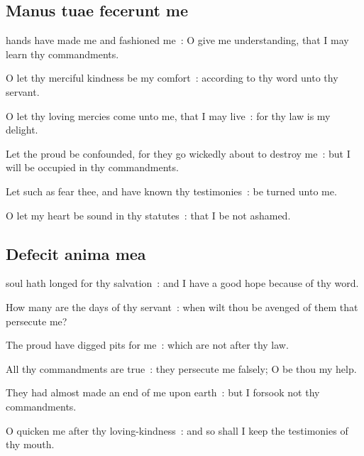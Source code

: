 \subsection{Manus tuae fecerunt me}
 hands have made me and fashioned me~: O give me understanding, that I may learn thy commandments.\par
{}
O let thy merciful kindness be my comfort~: according to thy word unto thy servant.\par
{}O let thy loving mercies come unto me, that I may live~: for thy law is my delight.\par
{}Let the proud be confounded, for they go wickedly about to destroy me~: but I will be occupied in thy commandments.\par
{}Let such as fear thee, and have known thy testimonies~: be turned unto me.\par
{}O let my heart be sound in thy statutes~: that I be not ashamed.\par

\subsection{Defecit anima mea}
 soul hath longed for thy salvation~: and I have a good hope because of thy word.\par
{}
How many are the days of thy servant~: when wilt thou be avenged of them that persecute me?\par
{}The proud have digged pits for me~: which are not after thy law.\par
{}All thy commandments are true~: they persecute me falsely; O be thou my help.\par
{}They had almost made an end of me upon earth~: but I forsook not thy commandments.\par
{}O quicken me after thy loving-kindness~: and so shall I keep the testimonies of thy mouth.\par

